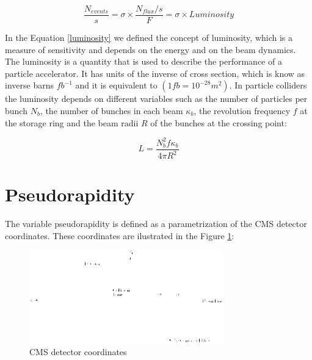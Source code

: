  \begin{equation}
 \label{luminosity}
  \frac{N_{events}}{s} = \sigma \times \frac{N_{flux}/s}{F} = \sigma \times Luminosity
 \end{equation}

 In the Equation \ref{luminosity} we defined the concept of luminosity, which is a measure of sensitivity and depends on the energy and on the beam dynamics.  The luminosity is a quantity that is used to 
 describe the performance of a particle accelerator. It has units of the inverse of cross section, which is know as inverse barns $fb^{-1}$ and it is equivalent to $(1 fb = 10^{-28} m^2)$. 
 In particle colliders the 
 luminosity depends on different variables such as the number of particles per bunch $N_b$, the number of bunches in each beam $\kappa_b$, the revolution frequency $f$ at the storage ring and the beam radii 
 $R$ of the bunches at the crossing point:
 
 \begin{equation}
  L = \frac{N_b^2 f \kappa_b}{4\pi R^2} 
 \end{equation}

 \section{Pseudorapidity}
 
 The variable pseudorapidity is defined as a parametrization of the CMS detector coordinates. These coordinates are ilustrated in the Figure \ref{CMSCoordinates}:
 
 \begin{figure}[h]
 \label{CMSCoordinates}
 \centering
 \caption{CMS detector coordinates}
 \includegraphics[width=0.75\textwidth]{./Capitulos/VariableDefinitions/CMS_coordinates}  
 \end{figure}


